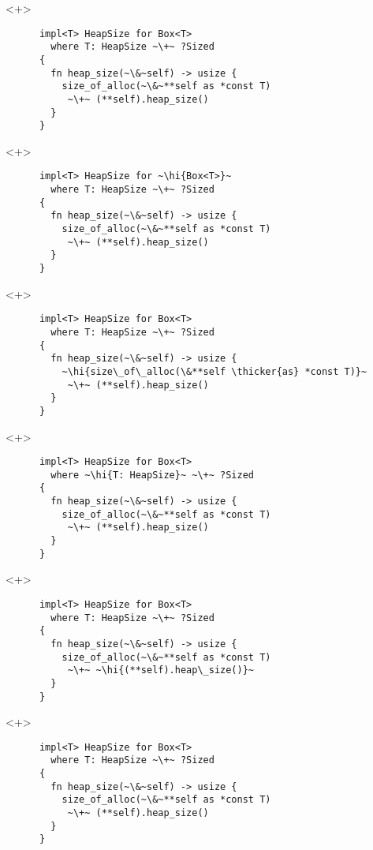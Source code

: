 \documentclass[usepdftitle=false]{beamer}
\renewcommand{\&}{\makebox[\widthof{\ampersand}][c]{\scalebox{0.9}[1.0]{\Book\ampersand}}}
\newcommand{\+}{\makebox[\widthof{+}][c]{\raisebox{-.2\height}{\scalefont{1.5}\Light+}}}
\newcommand{\thicker}[1]{\contourlength{0.26pt}\contour[10]{black}{#1}}
\newcommand{\hi}[1]{%
\tikz[baseline=(A.base)]
 \node[highlighting=0,inner sep=0pt,text depth=0pt] (A) {#1};%
}
\begin{document}
\begin{frame}[fragile]
  \begin{onlyenv}<+>
    \begin{verbatim}
      impl<T> HeapSize for Box<T>
        where T: HeapSize ~\+~ ?Sized
      {
        fn heap_size(~\&~self) -> usize {
          size_of_alloc(~\&~**self as *const T)
           ~\+~ (**self).heap_size()
        }
      }
    \end{verbatim}
  \end{onlyenv}
  \begin{onlyenv}<+>
    \begin{verbatim}
      impl<T> HeapSize for ~\hi{Box<T>}~
        where T: HeapSize ~\+~ ?Sized
      {
        fn heap_size(~\&~self) -> usize {
          size_of_alloc(~\&~**self as *const T)
           ~\+~ (**self).heap_size()
        }
      }
    \end{verbatim}
  \end{onlyenv}
  \begin{onlyenv}<+>
    \begin{verbatim}
      impl<T> HeapSize for Box<T>
        where T: HeapSize ~\+~ ?Sized
      {
        fn heap_size(~\&~self) -> usize {
          ~\hi{size\_of\_alloc(\&**self \thicker{as} *const T)}~
           ~\+~ (**self).heap_size()
        }
      }
    \end{verbatim}
  \end{onlyenv}
  \begin{onlyenv}<+>
    \begin{verbatim}
      impl<T> HeapSize for Box<T>
        where ~\hi{T: HeapSize}~ ~\+~ ?Sized
      {
        fn heap_size(~\&~self) -> usize {
          size_of_alloc(~\&~**self as *const T)
           ~\+~ (**self).heap_size()
        }
      }
    \end{verbatim}
  \end{onlyenv}
  \begin{onlyenv}<+>
    \begin{verbatim}
      impl<T> HeapSize for Box<T>
        where T: HeapSize ~\+~ ?Sized
      {
        fn heap_size(~\&~self) -> usize {
          size_of_alloc(~\&~**self as *const T)
           ~\+~ ~\hi{(**self).heap\_size()}~
        }
      }
    \end{verbatim}
  \end{onlyenv}
  \begin{onlyenv}<+>
    \begin{verbatim}
      impl<T> HeapSize for Box<T>
        where T: HeapSize ~\+~ ?Sized
      {
        fn heap_size(~\&~self) -> usize {
          size_of_alloc(~\&~**self as *const T)
           ~\+~ (**self).heap_size()
        }
      }
    \end{verbatim}
  \end{onlyenv}
\end{frame}
\end{document}
